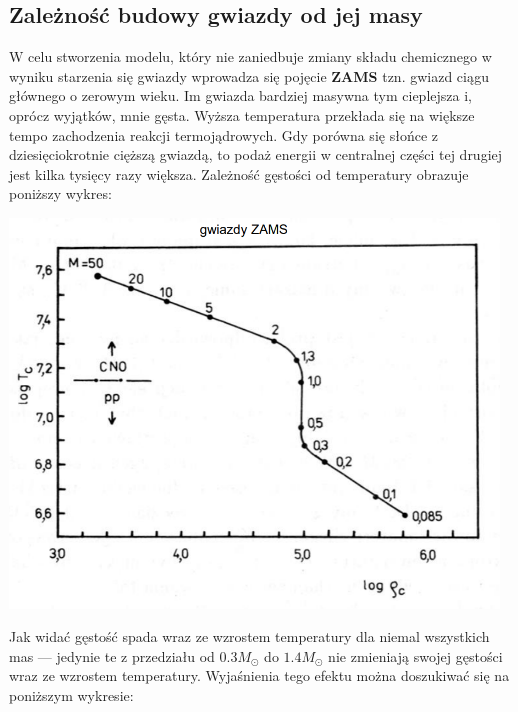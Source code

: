 \documentclass[../index.tex]{subfiles}
\begin{document}
        \subsection{Zależność budowy gwiazdy od jej masy}
            W celu stworzenia modelu, który nie zaniedbuje zmiany składu chemicznego w wyniku starzenia się gwiazdy wprowadza się pojęcie \textbf{ZAMS} tzn. gwiazd ciągu głównego o zerowym wieku. Im gwiazda bardziej masywna tym cieplejsza i, oprócz wyjątków, mnie gęsta. Wyższa temperatura przekłada się na większe tempo zachodzenia reakcji termojądrowych. Gdy porówna się słońce z dziesięciokrotnie cięższą gwiazdą, to podaż energii w centralnej części tej drugiej jest kilka tysięcy razy większa. Zależność gęstości od temperatury obrazuje poniższy wykres:
            \begin{center}
                \includegraphics[width=13cm]{images/temperatura-gestosc-relacja.png}
            \end{center}
            Jak widać gęstość spada wraz ze wzrostem temperatury dla niemal wszystkich mas — jedynie te z przedziału od \(0.3 M_\odot\) do \(1.4 M_\odot\) nie zmieniają swojej gęstości wraz ze wzrostem temperatury. Wyjaśnienia tego efektu można doszukiwać się na poniższym wykresie:
\end{document}
